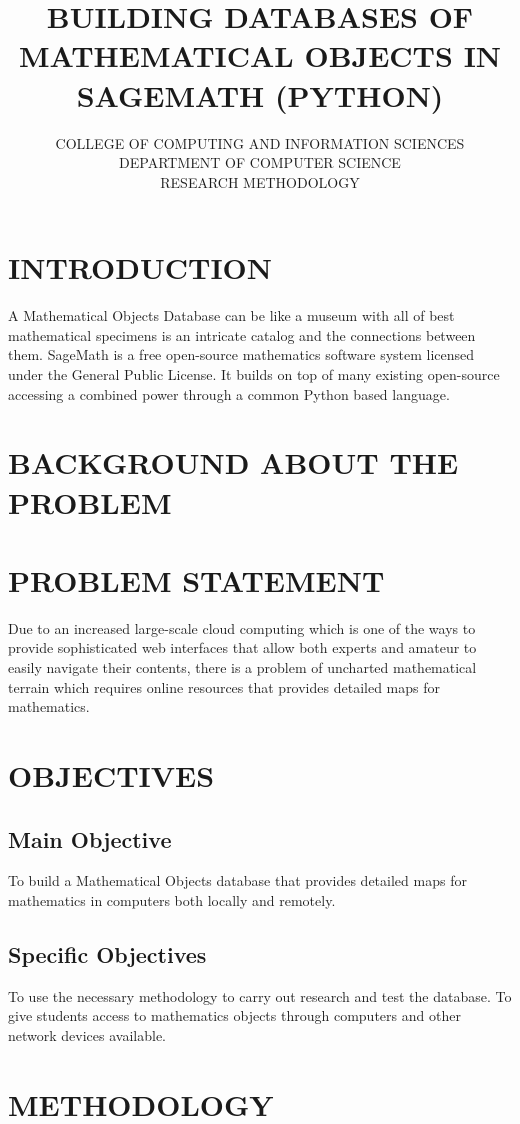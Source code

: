 \documentclass[11pt]{report}
\title{\textbf{BUILDING DATABASES OF MATHEMATICAL OBJECTS IN SAGEMATH (PYTHON)}}
\author{COLLEGE OF COMPUTING AND INFORMATION SCIENCES\\DEPARTMENT OF COMPUTER SCIENCE\\RESEARCH METHODOLOGY}
\begin{document}
\maketitle

\section{INTRODUCTION}
A Mathematical Objects Database can be like a museum with all of best mathematical specimens is an intricate catalog and the connections between them. SageMath is a free open-source mathematics software system licensed under the General Public License. It builds on top of many existing open-source accessing a combined power through a common Python based language.

\section{BACKGROUND ABOUT THE PROBLEM}

\section{PROBLEM STATEMENT}
Due to an increased large-scale cloud computing which is one of the ways to
provide sophisticated web interfaces that allow both experts and amateur to
easily navigate their contents, there is a problem of uncharted mathematical
terrain which requires online resources that provides detailed maps for
mathematics.
\section{OBJECTIVES}
\subsection{Main Objective}
To build a Mathematical Objects database that provides detailed maps for
mathematics in computers both locally and remotely.

\subsection{Specific Objectives}
To use the necessary methodology to carry out research and test the database.
To give students access to mathematics objects through computers and other
network devices available.

\section{METHODOLOGY}
\end{document}

